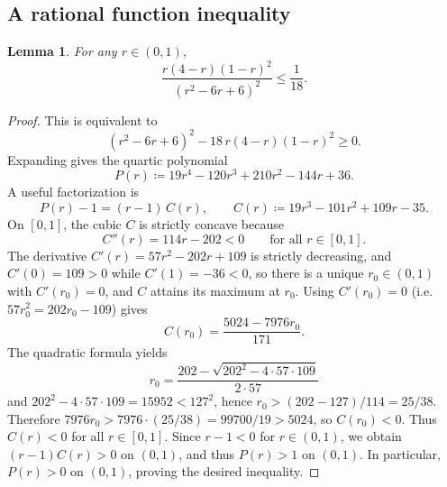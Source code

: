 \documentclass[11pt]{article}
\newtheorem{lemma}[theorem]{Lemma}
\begin{document}
\subsection{A rational function inequality}
\begin{lemma}\label{lem: rational function bound-TOBECHECKED}
For any $r\in(0,1)$, 
\[ \frac{r(4-r)(1-r)^2}{(r^2-6r+6)^2}\le \frac{1}{18}.
\]
\end{lemma}
\begin{proof}
This is equivalent to
\[
(r^2-6r+6)^2 - 18\,r(4-r)(1-r)^2 \ge 0.
\]
Expanding gives the quartic polynomial
\[
P(r)\coloneqq 19r^4-120r^3+210r^2-144r+36.
\]
A useful factorization is
\[
P(r)-1=(r-1)\,C(r),
\qquad
C(r)\coloneqq 19r^3-101r^2+109r-35.
\]
On $[0,1]$, the cubic $C$ is strictly concave because
\[
C''(r)=114r-202<0\qquad\text{for all }r\in[0,1].
\]
The derivative $C'(r)=57r^2-202r+109$ is strictly decreasing, and $C'(0)=109>0$ while $C'(1)=-36<0$,
so there is a unique $r_0\in(0,1)$ with $C'(r_0)=0$, and $C$ attains its maximum at $r_0$.
Using $C'(r_0)=0$ (i.e.\ $57r_0^2=202r_0-109$) gives
\[
C(r_0)=\frac{5024-7976r_0}{171}.
\]
The quadratic formula yields
\[
r_0=\frac{202-\sqrt{202^2-4\cdot 57\cdot 109}}{2\cdot 57}
\]
and $202^2-4\cdot 57\cdot 109=15952<127^2$, hence $r_0>(202-127)/114=25/38$.
Therefore $7976r_0>7976\cdot(25/38)=99700/19>5024$, so $C(r_0)<0$.
Thus $C(r)<0$ for all $r\in[0,1]$. Since $r-1<0$ for $r\in(0,1)$, we obtain $(r-1)C(r)>0$ on $(0,1)$,
and thus $P(r)>1$ on $(0,1)$. In particular, $P(r)>0$ on $(0,1)$, proving the desired inequality.
\end{proof}
\end{document}
